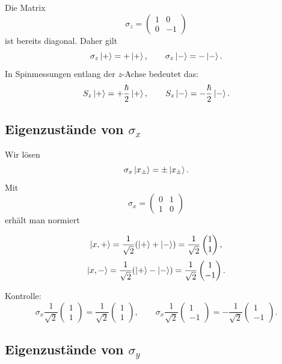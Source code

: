 Die Matrix
\[
    \sigma_z=
    \begin{pmatrix}
        1&0\\0&-1
    \end{pmatrix}
\]
ist bereits diagonal. Daher gilt
\[
    \sigma_z\left|+\right\rangle=+\left|+\right\rangle,
    \qquad
    \sigma_z\left|-\right\rangle=-\left|-\right\rangle.
\]
In Spinmessungen entlang der \(z\)-Achse bedeutet das:
\[
    S_z\left|+\right\rangle=+\frac{\hbar}{2}\left|+\right\rangle,
    \qquad
    S_z\left|-\right\rangle=-\frac{\hbar}{2}\left|-\right\rangle.
\]

\subsection{Eigenzustände von \(\sigma_x\)}

Wir lösen
\[
    \sigma_x\left|x_\pm\right\rangle=\pm\left|x_\pm\right\rangle.
\]
Mit
\[
    \sigma_x=
    \begin{pmatrix}
        0&1\\1&0
    \end{pmatrix}
\]
erhält man normiert
\begin{formulabox}
\[
    \left|x,+\right\rangle=\frac{1}{\sqrt2}(\left|+\right\rangle+\left|-\right\rangle)
    =\frac{1}{\sqrt2}
    \begin{pmatrix}
        1\\1
    \end{pmatrix},
\]
\[
    \left|x,-\right\rangle=\frac{1}{\sqrt2}(\left|+\right\rangle-\left|-\right\rangle)
    =\frac{1}{\sqrt2}
    \begin{pmatrix}
        1\\-1
    \end{pmatrix}.
\]
\end{formulabox}

Kontrolle:
\[
    \sigma_x\frac{1}{\sqrt2}
    \begin{pmatrix}1\\1\end{pmatrix}
    =\frac{1}{\sqrt2}
    \begin{pmatrix}1\\1\end{pmatrix},
    \qquad
    \sigma_x\frac{1}{\sqrt2}
    \begin{pmatrix}1\\-1\end{pmatrix}
    =-\frac{1}{\sqrt2}
    \begin{pmatrix}1\\-1\end{pmatrix}.
\]

\subsection{Eigenzustände von \(\sigma_y\)}

